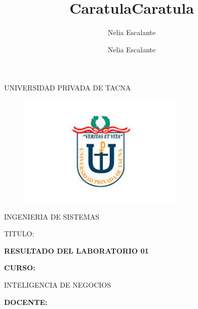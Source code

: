 \documentclass[12pt,letterpaper]{article}
\author{Nelia Escalante}
\title{Caratula}
\begin{document}
\author{Nelia Escalante}
\title{Caratula}

\begin{titlepage}
\begin{center}
\large{UNIVERSIDAD PRIVADA DE TACNA}\\
\vspace*{-0.025in}
\begin{figure}[htb]
\begin{center}
\includegraphics[width=8cm]{./IMG/logo}
\end{center}
\end{figure}
\vspace*{0.15in}
INGENIERIA DE SISTEMAS  \\

\vspace*{0.5in}
\begin{large}
TITULO:\\
\end{large}

\vspace*{0.1in}
\begin{Large}
\textbf{RESULTADO DEL LABORATORIO 01} \\
\end{Large}

\vspace*{0.3in}
\begin{Large}
\textbf{CURSO:} \\
\end{Large}

\vspace*{0.1in}
\begin{large}
INTELIGENCIA DE NEGOCIOS\\
\end{large}

\vspace*{0.3in}
\begin{Large}
\textbf{DOCENTE:} \\
\end{Large}


\end{center}
\end{titlepage}
\end{document}
